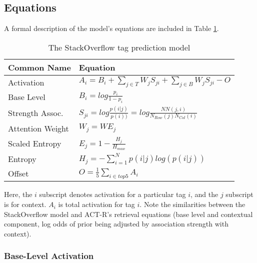 \documentclass[10pt,letterpaper]{article}
\begin{document}
\subsection{Equations}

A formal description of the model's equations are included in Table \ref{sample-table}. 

\renewcommand{\arraystretch}{1.5}%
\renewcommand{\tabcolsep}{.5mm}
\begin{table}[!ht]
  \begin{center} 
    \caption{The StackOverflow tag prediction model} 
    \label{sample-table} 
    \vskip 0.12in
    \begin{tabular}{ll} 
      \hline
      Common Name &  Equation \\
      \hline
      Activation & 		$A_{i} = B_{i} + \sum_{j\in T}^{ } W_{j} S_{ji} + \sum_{j\in B}^{ } W_{j} S_{ji} - O$ \\
      Base Level & 		$B_{i} = log \frac{p_{i}}{1-p_{i}}$ \\
      Strength Assoc. &		$S_{ji} = log \frac{p(i|j)}{p(i))} = log \frac{NN(j,i)}{N_{Row}(j)N_{Col}(i)}$ \\
      Attention Weight	& 	$W_{j} = WE_{j}$ \\
      Scaled Entropy & 		$E_{j} = 1-\frac{H_{j}}{H_{max}}$ \\
      Entropy & 		$H_{j} = -\sum_{i=1}^{N}p(i|j)log\left (  p(i|j) \right )$ \\
      Offset & 			$O = \frac{1}{5}\sum_{i\in top 5}^{ } A_{i}$ \\
      \hline
    \end{tabular} 
  \end{center} 
\end{table}

Here, the $i$ subscript denotes activation for a particular tag $i$, and the $j$ subscript is for context.
$A_{i}$ is total activation for tag $i$.
Note the similarities between the StackOverflow model and ACT-R's retrieval equations (base level and contextual component, log odds of prior being adjusted by association strength with context).

\subsubsection{Base-Level Activation}
\end{document}
